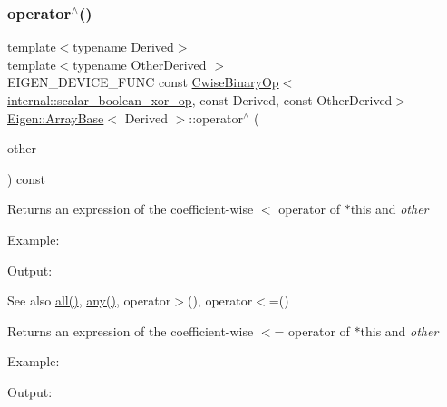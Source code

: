 \subsubsection{\texorpdfstring{operator$^\wedge$()}{operator^()}}
{\footnotesize\ttfamily template$<$typename Derived$>$ \\
template$<$typename Other\+Derived $>$ \\
E\+I\+G\+E\+N\+\_\+\+D\+E\+V\+I\+C\+E\+\_\+\+F\+U\+NC const \mbox{\hyperlink{class_eigen_1_1_cwise_binary_op}{Cwise\+Binary\+Op}}$<$\mbox{\hyperlink{struct_eigen_1_1internal_1_1scalar__boolean__xor__op}{internal\+::scalar\+\_\+boolean\+\_\+xor\+\_\+op}}, const Derived, const Other\+Derived$>$ \mbox{\hyperlink{class_eigen_1_1_array_base}{Eigen\+::\+Array\+Base}}$<$ Derived $>$\+::operator$^\wedge$ (\begin{DoxyParamCaption}\item[{const E\+I\+G\+E\+N\+\_\+\+C\+U\+R\+R\+E\+N\+T\+\_\+\+S\+T\+O\+R\+A\+G\+E\+\_\+\+B\+A\+S\+E\+\_\+\+C\+L\+A\+SS$<$ Other\+Derived $>$ \&}]{other }\end{DoxyParamCaption}) const\hspace{0.3cm}{\ttfamily [inline]}}

\begin{DoxyReturn}{Returns}
an expression of the coefficient-\/wise $<$ operator of $\ast$this and {\itshape other} 
\end{DoxyReturn}
Example\+: 
\begin{DoxyCodeInclude}{0}
\end{DoxyCodeInclude}
 Output\+: 
\begin{DoxyVerbInclude}
\end{DoxyVerbInclude}


\begin{DoxySeeAlso}{See also}
\mbox{\hyperlink{class_eigen_1_1_dense_base_ae42ab60296c120e9f45ce3b44e1761a4}{all()}}, \mbox{\hyperlink{class_eigen_1_1_dense_base_abfbf4cb72dd577e62fbe035b1c53e695}{any()}}, operator$>$(), operator$<$=()
\end{DoxySeeAlso}
\begin{DoxyReturn}{Returns}
an expression of the coefficient-\/wise $<$= operator of $\ast$this and {\itshape other} 
\end{DoxyReturn}
Example\+: 
\begin{DoxyCodeInclude}{0}
\end{DoxyCodeInclude}
 Output\+: 
\begin{DoxyVerbInclude}
\end{DoxyVerbInclude}


